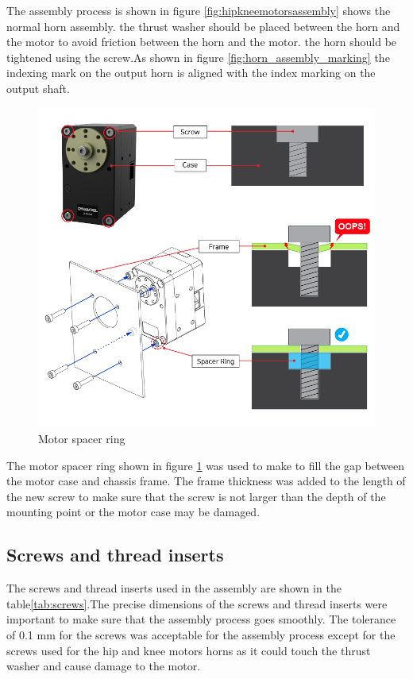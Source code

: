 The assembly process is shown in figure \ref{fig:hipkneemotorsassembly} shows the normal horn assembly. the thrust washer should be placed between the horn and the motor to avoid friction between the horn and the motor. the horn should be tightened using the screw.As shown in figure \ref{fig:horn_assembly_marking} the indexing mark on the output horn is aligned with the index marking on the output shaft.

\begin{figure}[h]
	\centering
	\includegraphics[width=0.5\linewidth]{motor_spacer_ring}
	\caption{Motor spacer ring}
	\label{fig:motorspacerring}
\end{figure}
The motor spacer ring shown in figure \ref{fig:motorspacerring} was used to make to fill the gap between the motor case and chassis frame.
The frame thickness was added to the length of the new screw to make sure that the screw is not larger than the depth of the mounting point or the motor case may be damaged.

\subsection{Screws and thread inserts}
The screws and thread inserts used in the assembly are shown in the table\ref{tab:screws}.The precise dimensions of the screws and thread inserts were important to make sure that the assembly process goes smoothly.
The tolerance of 0.1 mm for the screws was acceptable for the assembly process except for the screws used for the hip and knee motors horns as it could touch the thrust washer and cause damage to the motor.

